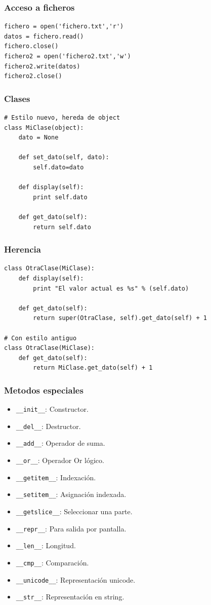 \documentclass[10pt]{beamer}
\begin{document}
  \begin{frame}[containsverbatim]
    \frametitle{Acceso a ficheros}
    \begin{verbatim}
fichero = open('fichero.txt','r')
datos = fichero.read()
fichero.close()
fichero2 = open('fichero2.txt','w')
fichero2.write(datos)
fichero2.close()
    \end{verbatim}
  \end{frame}

  \begin{frame}[containsverbatim]
    \frametitle{Clases}
    \begin{verbatim}
# Estilo nuevo, hereda de object
class MiClase(object):
    dato = None

    def set_dato(self, dato):
        self.dato=dato

    def display(self):
        print self.dato

    def get_dato(self):
        return self.dato
    \end{verbatim}
  \end{frame}

  \begin{frame}[containsverbatim]
    \frametitle{Herencia}
    \begin{verbatim}
class OtraClase(MiClase):
    def display(self):
        print "El valor actual es %s" % (self.dato)

    def get_dato(self):
        return super(OtraClase, self).get_dato(self) + 1

# Con estilo antiguo
class OtraClase(MiClase):
    def get_dato(self):
        return MiClase.get_dato(self) + 1
    \end{verbatim}
  \end{frame}

  \begin{frame}[containsverbatim]
    \frametitle{Metodos especiales}
    \begin{itemize}
      \item \verb+__init__+: Constructor.
      \item \verb+__del__+: Destructor.
      \item \verb+__add__+: Operador de suma.
      \item \verb+__or__+: Operador Or lógico.
      \item \verb+__getitem__+: Indexación.
      \item \verb+__setitem__+: Asignación indexada.
      \item \verb+__getslice__+: Seleccionar una parte.
      \item \verb+__repr__+: Para salida por pantalla.
      \item \verb+__len__+: Longitud.
      \item \verb+__cmp__+: Comparación.
      \item \verb+__unicode__+: Representación unicode.
      \item \verb+__str__+: Representación en string.
    \end{itemize}
  \end{frame}
\end{document}
